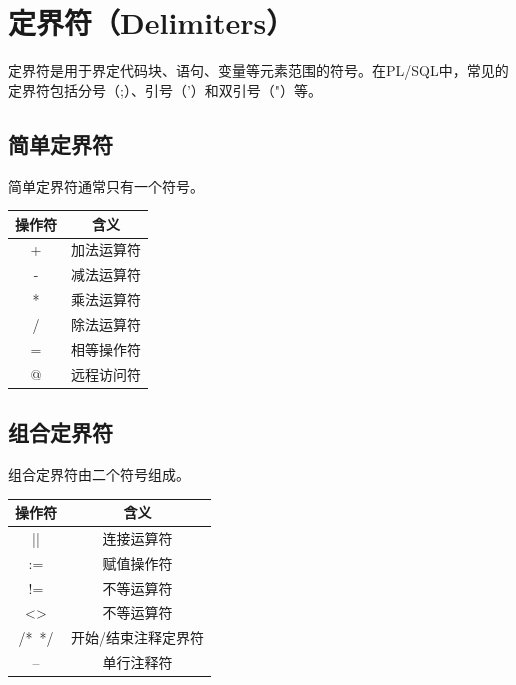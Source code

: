 \documentclass[11pt, a4paper, oneside, UTF8]{ctexbook}
\begin{document}
\section{定界符（Delimiters）}
定界符是用于界定代码块、语句、变量等元素范围的符号。在PL/SQL中，常见的定界符包括分号（;）、引号（'）和双引号（"）等。
\subsection{简单定界符}
简单定界符通常只有一个符号。

\begin{center}
  \begin{minipage}{\textwidth}
    \centering %
    \begin{tabular}{|c|c|} %
      \hline %
      \textbf{操作符} & \textbf{含义}  \\
      \hline
      + & 加法运算符  \\
      - & 减法运算符  \\
      * & 乘法运算符  \\
      / & 除法运算符  \\
      = & 相等操作符  \\
      @ & 远程访问符  \\
      \hline
    \end{tabular}
    \captionsetup{hypcap=false}
    \label{tab:简单定界符} %
  \end{minipage}
\end{center}

\subsection{组合定界符}
组合定界符由二个符号组成。

\begin{center}
  \begin{minipage}{\textwidth}
    \centering %
    \begin{tabular}{|c|c|} %
      \hline %
      \textbf{操作符} & \textbf{含义}  \\
      \hline
      ||  & 连接运算符  \\
      := & 赋值操作符  \\
      !=  & 不等运算符  \\
      <> & 不等运算符  \\
      /*\ */ & 开始/结束注释定界符  \\
      --  & 单行注释符  \\
      \hline
    \end{tabular}
    \captionsetup{hypcap=false}
    \label{tab:组合定界符} %
  \end{minipage}
\end{center}
\end{document}
